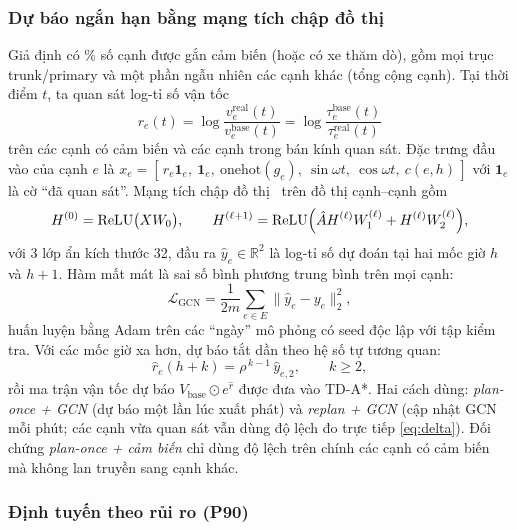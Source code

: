 \subsubsection{Dự báo ngắn hạn bằng mạng tích chập đồ thị}\label{sec:method:gcn}

Giả định có \SensorFrac\% số cạnh được gắn cảm biến (hoặc có xe thăm dò), gồm mọi trục trunk/primary và một phần ngẫu
nhiên các cạnh khác (tổng cộng \NSensors{} cạnh). Tại thời điểm $t$, ta quan sát log-tỉ số vận tốc
\begin{equation}
r_e(t) = \log\frac{v^{\text{real}}_e(t)}{v^{\text{base}}_e(t)} = \log\frac{\tau^{\text{base}}_e(t)}{\tau^{\text{real}}_e(t)}
\label{eq:logratio}
\end{equation}
trên các cạnh có cảm biến và các cạnh trong bán kính quan sát. Đặc trưng đầu vào của cạnh $e$ là
$x_e=[\,r_e\mathbf{1}_e,\ \mathbf{1}_e,\ \text{onehot}(g_e),\ \sin\omega t,\ \cos\omega t,\ c(e,h)\,]$ với $\mathbf{1}_e$ là cờ
``đã quan sát''. Mạng tích chập đồ thị~\cite{kipf2017gcn} trên đồ thị cạnh--cạnh gồm
\begin{equation}
H^{(0)} = \operatorname{ReLU}\bigl(XW_0\bigr), \qquad
H^{(\ell+1)} = \operatorname{ReLU}\Bigl(\hat{A}H^{(\ell)}W_1^{(\ell)} + H^{(\ell)}W_2^{(\ell)}\Bigr),
\label{eq:gcn}
\end{equation}
với 3 lớp ẩn kích thước 32, đầu ra $\hat{y}_e\in\mathbb{R}^2$ là log-tỉ số dự đoán tại hai mốc giờ $h$ và $h+1$. Hàm mất mát
là sai số bình phương trung bình trên mọi cạnh:
\begin{equation}
\mathcal{L}_{\text{GCN}} = \frac{1}{2m}\sum_{e\in E}\bigl\|\hat{y}_e - y_e\bigr\|_2^2,
\label{eq:gcn-loss}
\end{equation}
huấn luyện bằng Adam trên các ``ngày'' mô phỏng có seed độc lập với tập kiểm tra. Với các mốc giờ xa hơn, dự báo tắt dần
theo hệ số tự tương quan:
\begin{equation}
\hat{r}_e(h+k) = \rho^{\,k-1}\,\hat{y}_{e,2}, \qquad k\ge 2,
\label{eq:decay}
\end{equation}
rồi ma trận vận tốc dự báo $V_{\text{base}}\odot e^{\hat r}$ được đưa vào TD-A*. Hai cách dùng: \emph{plan-once + GCN}
(dự báo một lần lúc xuất phát) và \emph{replan + GCN} (cập nhật GCN mỗi \GcnRecompute{} phút; các cạnh vừa quan sát vẫn
dùng độ lệch đo trực tiếp \eqref{eq:delta}). Đối chứng \emph{plan-once + cảm biến} chỉ dùng độ lệch trên chính các cạnh
có cảm biến mà không lan truyền sang cạnh khác.

\subsubsection{Định tuyến theo rủi ro (P90)}\label{sec:method:risk}

